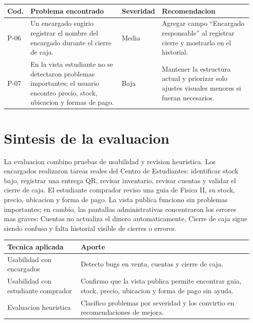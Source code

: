 \documentclass[12pt,letterpaper]{article}
\begin{document}
\vspace{6pt}

\begin{center}
\small
\begin{tabularx}{\textwidth}{|B{1.1cm}|Y|B{1.9cm}|Y|}
\hline
Cod. & Problema encontrado & Severidad & Recomendacion \\
\hline
P-06 & Un encargado sugirio registrar el nombre del encargado durante el cierre de caja. & Media & Agregar campo ``Encargado responsable'' al registrar cierre y mostrarlo en el historial. \\
\hline
P-07 & En la vista estudiante no se detectaron problemas importantes; el usuario encontro precio, stock, ubicacion y formas de pago. & Baja & Mantener la estructura actual y priorizar solo ajustes visuales menores si fueran necesarios. \\
\hline
\end{tabularx}
\end{center}

\section{Sintesis de la evaluacion}

La evaluacion combino pruebas de usabilidad y revision heuristica. Los encargados realizaron tareas reales del Centro de Estudiantes: identificar stock bajo, registrar una entrega QR, revisar inventario, revisar cuentas y validar el cierre de caja. El estudiante comprador reviso una guia de Fisica II, su stock, precio, ubicacion y forma de pago. La vista publica funciono sin problemas importantes; en cambio, las pantallas administrativas concentraron los errores mas graves: Cuentas no actualiza el dinero automaticamente, Cierre de caja sigue siendo confuso y falta historial visible de cierres o errores.

\begin{center}
\small
\begin{tabularx}{\textwidth}{|B{4.2cm}|Y|}
\hline
Tecnica aplicada & Aporte \\
\hline
Usabilidad con encargados & Detecto bugs en venta, cuentas y cierre de caja. \\
\hline
Usabilidad con estudiante comprador & Confirmo que la vista publica permite encontrar guia, stock, precio, ubicacion y forma de pago sin ayuda. \\
\hline
Evaluacion heuristica & Clasifico problemas por severidad y los convirtio en recomendaciones de mejora. \\
\hline
\end{tabularx}
\end{center}
\end{document}
